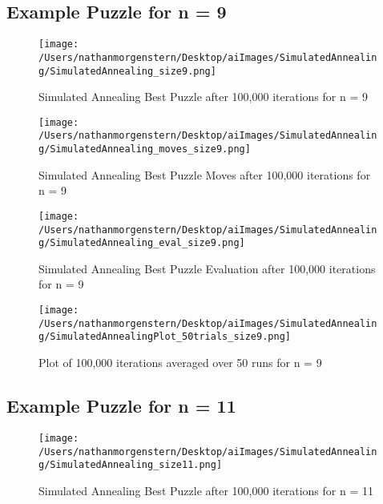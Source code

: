 \documentclass{report}
\begin{document}
\subsection{Example Puzzle for n = 9}
	
	\begin{figure}[H]
	\centering
	\texttt{[image: /Users/nathanmorgenstern/Desktop/aiImages/SimulatedAnnealing/SimulatedAnnealing\_size9.png]}
	\caption{Simulated Annealing Best Puzzle after 100,000 iterations for n = 9} 
	\label{fig: Simulated Annealing Best Puzzle after 100,000 iterations for n = 9}
	\end{figure}
	
	\begin{figure}[H]
	\centering
	\texttt{[image: /Users/nathanmorgenstern/Desktop/aiImages/SimulatedAnnealing/SimulatedAnnealing\_moves\_size9.png]}
	\caption{Simulated Annealing Best Puzzle Moves after 100,000 iterations for n = 9} 
	\label{fig: Simulated Annealing Best Puzzle Moves after 100,000 iterations for n = 9}
	\end{figure}

	\begin{figure}[H]
	\centering
	\texttt{[image: /Users/nathanmorgenstern/Desktop/aiImages/SimulatedAnnealing/SimulatedAnnealing\_eval\_size9.png]}
	\caption{Simulated Annealing Best Puzzle Evaluation after 100,000 iterations for n = 9} 
	\label{fig: Simulated Annealing Best Puzzle Evaluation after 100,000 iterations for n = 9} 
	\end{figure}

	\begin{figure}[H]
	\centering
	\texttt{[image: /Users/nathanmorgenstern/Desktop/aiImages/SimulatedAnnealing/SimulatedAnnealingPlot\_50trials\_size9.png]}
	\caption{Plot of 100,000 iterations averaged over 50 runs for n = 9}
	\label{fig: Plot of 100,000 iterations averaged over 50 runs for n = 9}
	\end{figure}

\subsection{Example Puzzle for n = 11}
	\begin{figure}[H]
	\centering
	\texttt{[image: /Users/nathanmorgenstern/Desktop/aiImages/SimulatedAnnealing/SimulatedAnnealing\_size11.png]}
	\caption{Simulated Annealing Best Puzzle after 100,000 iterations for n = 11} 
	\label{fig: Simulated Annealing Best Puzzle after 100,000 iterations for n = 11}
	\end{figure}
	
\end{document}
